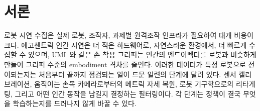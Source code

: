 \documentclass[conference,10pt]{IEEEtran}
\begin{document}
\begin{abstract}
상대 데카르트(Cartesian) 엔드이펙터 액션으로 변환하며, 작업공간이나 IK 필터링은 하지 않는다(330 에피소드, 자세 점프 필터 후
학습 행 48{,}411개). 공개 X-VLA base를 점검한 결과 도메인 soft prompt 슬롯 30개 중 8개만 학습된 적이 있었으며, 이는 이전 실행
결과의 해석을 바꾼다. 로봇 카메라 프레임에서 에고 전용 모델은 유용한 동작 방향을 예측하지 못한다(코사인 중앙값 $-0.05$/$-0.03$,
로봇으로 학습한 모델은 $+0.81$/$+0.77$). 도메인 간에 이미지와 상태를 맞바꾸어 보면 격차는 손목 이미지에 있으며, 두 도메인의 손목
이미지 선명도는 약 30$\times$ 차이 난다. 로봇 파인튜닝의 초기값으로 쓰면 에고 모델은 3.9$\times$ 낮은 학습 손실에서 출발하지만,
다른 조건이 동일한 실행에서 60k 스텝 무렵 그 이점은 동률로 줄어든다. 버전 4는 저데이터 ablation을 추가한다. 로봇 에피소드 30개만으로,
base 모델과 100k·300k 스텝 에고 사전학습 체크포인트에서 시작하는, 다른 조건이 동일한 세 파인튜닝 실행이다. 두 에고 초기화 모두
scratch 학습 손실의 절반 미만에서 출발하며, 그 이점은 약 100k 스텝(100k 스텝 사전학습)과 약 200k 스텝(300k 스텝 사전학습)에서
사라지고, 세 실행 모두 30개 에피소드에 심하게 과적합한다. 이들 중 아직 로봇에서 실행된 것은 없다. 로봇 에피소드 312개로 파인튜닝한
에고 초기화 모델은 폐루프에서 큐브 세 개를 끝까지 쌓았으나, 시도 횟수를 세지 않았으므로 성공률이 아닌 시연으로만 보고한다. 새로운
공간 배치나 보지 못한 쌓기 순서를 검증하는 실험은 없으며, 이 데이터가 뒷받침할 수 있는 주장과 없는 주장을 명시한다. 버전 3의
제XII절이었던 단일 팔 접근 연구는 이제 제2부가 되었다. 버전 4.1에는 수집 하드웨어, 즉 우리가 제작한
업스트림 HandUMI 설계, 수정한 부품, 추가한 IMU에 대한 설명을 더했다.
\end{abstract}

\section{서론}\label{sec:intro}
로봇 시연 수집은 실제 로봇, 조작자, 과제별 원격조작 인프라가 필요하여 대개 비용이 크다. 에고센트릭 인간 시연은 더 적은 하드웨어로,
자연스러운 환경에서, 더 빠르게 수집할 수 있으며, UMI~\cite{chi2024umi}와 같은 손 착용 그리퍼는 인간의 엔드이펙터를 로봇과 비슷하게
만들어 그리퍼 수준의 embodiment 격차를 줄인다. 이러한 데이터가 특정 로봇으로 전이되는지는 처음부터 끝까지 점검되는 일이 드문
일련의 단계에 달려 있다. 센서 캘리브레이션, 움직이는 손목 카메라로부터의 메트릭 자세 복원, 로봇 기구학으로의 리타게팅, 그리고
어떤 인간 동작을 남길지 결정하는 필터링이다. 각 단계는 정책이 결국 무엇을 학습하는지를 드러나지 않게 바꿀 수 있다.
\end{document}
